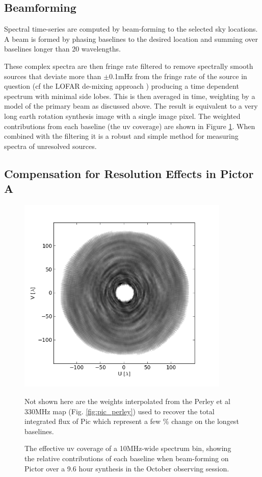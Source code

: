 \documentclass[preprint]{aastex}
\begin{document}
\subsection{Beamforming}
\label{sec:beamforming}
Spectral time-series are computed by beam-forming to the selected sky
locations. A beam is formed by phasing baselines to the desired location and
summing over baselines longer than 20 wavelengths.


 These complex spectra are then fringe rate filtered to remove spectrally
smooth sources that deviate more than $\pm$0.1mHz from the fringe rate of the source in question
 \citep{Parsons:2009p7859} (cf the LOFAR
de-mixing approach \citep{Offringa:2012p9691})  producing a time dependent
spectrum with minimal side lobes. This is then averaged in time,  weighting by a model of the primary
beam as discussed above.
The result is equivalent to
a very long earth rotation synthesis image with a single image pixel. The weighted
contributions from each baseline (the uv coverage) are shown in Figure \ref{fig:uv_coverage}.  When
combined with the filtering it is a robust and simple method for measuring
spectra of unresolved sources. 

\subsection{Compensation for Resolution Effects in Pictor A}

\begin{figure}
\includegraphics[width=0.9\textwidth]{plots/PicA_Oct2011_uv_coverage.png}
\caption{The effective uv coverage of a 10MHz-wide spectrum bin, showing the relative contributions of each baseline when beam-forming on Pictor over a 9.6 hour synthesis in the October observing session. \label{fig:uv_coverage}}
Not shown here are the weights interpolated from the Perley et al 330MHz map (Fig. \ref{fig:pic_perley}) used to recover the total integrated flux of Pic  which represent a few \% change on the longest baselines.
\end{figure}
\end{document}
